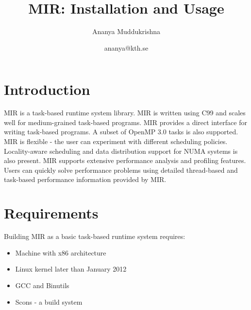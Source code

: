 \documentclass[11pt,a4paper,notitlepage]{article}
\title{MIR: Installation and Usage}
\author{Ananya Muddukrishna}
\date{ananya@kth.se}
\begin{document}
\maketitle


\section{Introduction}
MIR is a task-based runtime system library.
MIR is written using C99 and scales well for medium-grained task-based programs. 
MIR provides a direct interface for writing task-based programs.
A subset of OpenMP 3.0 tasks is also supported.
MIR is flexible - the user can experiment with different scheduling policies.
Locality-aware scheduling and data distribution support for NUMA systems is also present.
MIR supports extensive performance analysis and profiling features.
Users can quickly solve performance problems using detailed thread-based and task-based performance information provided by MIR.

\section{Requirements}
Building MIR as a basic task-based runtime system requires:
\begin{itemize}
\item Machine with x86 architecture
\item Linux kernel later than January 2012
\item GCC and Binutils
\item Scons - a build system
\end{itemize}
\end{document}
